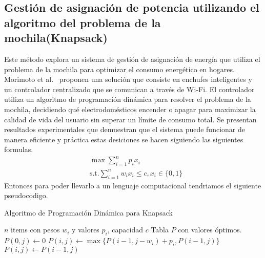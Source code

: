 \documentclass[9pt,a4paper,twoside]{rho-class/rho}
\begin{document}
        \subsection{Gestión de asignación de potencia utilizando el algoritmo del problema de la mochila(Knapsack)}
            Este método explora un sistema de gestión de asignación de energía que utiliza el problema de la mochila para optimizar el consumo energético en hogares.  Morimoto et al.~\cite{Morimoto2014} proponen una solución que consiste en enchufes inteligentes y un controlador centralizado que se comunican a través de Wi-Fi. El controlador utiliza un algoritmo de programación dinámica para resolver el problema de la mochila, decidiendo qué electrodomésticos encender o apagar para maximizar la calidad de vida del usuario sin superar un límite de consumo total. Se presentan resultados experimentales que demuestran que el sistema puede funcionar de manera eficiente y práctica estas desiciones se hacen siguiendo las siguientes formulas.
            \begin{align}
                &\max \sum_{i=1}^{n} p_ix_i \\
                &\text{s.t.} \sum_{i=1}^{n} w_ix_i \leq c, x_i \in \{0,1\}
            \end{align}
            Entonces para poder llevarlo a un lenguaje computacional tendriamos el siguiente pseudocodigo.
            \begin{algorithm}
            \caption{Algoritmo de Programación Dinámica para Knapsack}
            \begin{algorithmic}[1]
            \REQUIRE $n$ items con pesos $w_i$ y valores $p_i$, capacidad $c$
            \ENSURE Tabla $P$ con valores óptimos.
                \STATE $P(0,j) \gets 0$
            \ENDFOR
                        \STATE $P(i,j) \gets \max\{P(i-1,j-w_i) + p_i, P(i-1,j)\}$
                    \ELSE
                        \STATE $P(i,j) \gets P(i-1,j)$
                    \ENDIF
                \ENDFOR
            \ENDFOR
            \end{algorithmic}
            \end{algorithm}
\end{document}
